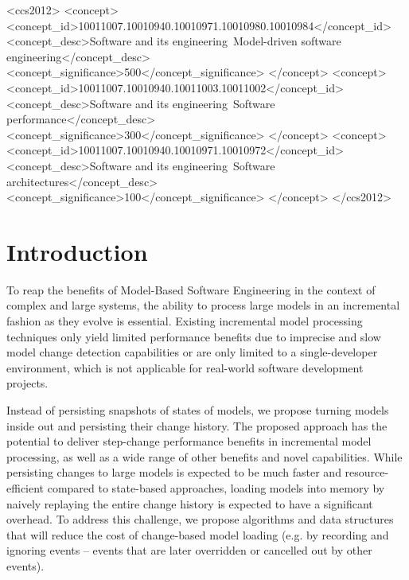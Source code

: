 \documentclass[sigconf]{acmart}
\begin{document}
%
%

\begin{CCSXML}
<ccs2012>
<concept>
<concept_id>10011007.10010940.10010971.10010980.10010984</concept_id>
<concept_desc>Software and its engineering~Model-driven software engineering</concept_desc>
<concept_significance>500</concept_significance>
</concept>
<concept>
<concept_id>10011007.10010940.10011003.10011002</concept_id>
<concept_desc>Software and its engineering~Software performance</concept_desc>
<concept_significance>300</concept_significance>
</concept>
<concept>
<concept_id>10011007.10010940.10010971.10010972</concept_id>
<concept_desc>Software and its engineering~Software architectures</concept_desc>
<concept_significance>100</concept_significance>
</concept>
</ccs2012>
\end{CCSXML}




\maketitle

\section{Introduction}
\label{sec:introduction}
To reap the benefits of Model-Based Software Engineering in the context of complex and large systems, the ability to process large models in an incremental fashion as they evolve is essential. Existing incremental model processing techniques only yield limited performance benefits due to imprecise and slow model change detection capabilities or are only limited to a single-developer environment, which is not applicable for real-world software development projects.


Instead of persisting snapshots of states of models, we propose turning models inside out and persisting their change history. The proposed approach has the potential to deliver step-change performance benefits in incremental model processing, as well as a wide range of other benefits and novel capabilities. While persisting changes to large models is expected to be much faster and resource-efficient compared to state-based approaches, loading models into memory by naively replaying the entire change history is expected to have a significant overhead. To address this challenge, we propose algorithms and data structures that will reduce the cost of change-based model loading (e.g. by recording and ignoring events -- events that are later overridden or cancelled out by other events).%
\end{document}
